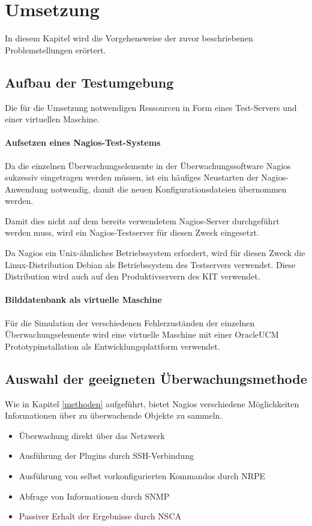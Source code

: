 \section{Umsetzung}
In diesem Kapitel wird die Vorgehensweise der zuvor beschriebenen Problemstellungen erörtert.

\subsection{Aufbau der Testumgebung}

Die für die Umsetzung notwendigen Ressourcen in Form eines Test-Servers und einer virtuellen Maschine.
\paragraph{Aufsetzen eines Nagios-Test-Systems}
Da die einzelnen Überwachungselemente in der Überwachungssoftware Nagios sukzessiv eingetragen werden müssen, ist ein häufiges Neustarten der Nagios-Anwendung notwendig, damit die neuen Konfigurationsdateien übernommen werden.

Damit dies nicht auf dem bereits verwendetem Nagios-Server durchgeführt werden muss, wird ein Nagios-Testserver für diesen Zweck eingesetzt.

Da Nagios ein Unix-ähnliches Betriebssystem erfordert, wird für diesen Zweck die Linux-Distribution Debian als Betriebssystem des Testservers verwendet.
Diese Distribution wird auch auf den Produktivservern des KIT verwendet.

\paragraph{Bilddatenbank als virtuelle Maschine}
Für die Simulation der verschiedenen Fehlerzuständen der einzelnen Überwachungselemente wird eine virtuelle Maschine mit einer \gls{OracleUCM} Prototypinstallation  als Entwicklungsplattform verwendet.

\subsection{Auswahl der geeigneten Überwachungsmethode}
\label{sectunixagents}
Wie in Kapitel \ref{methoden} aufgeführt, bietet Nagios verschiedene Möglichkeiten Informationen über zu überwachende Objekte zu sammeln.

\begin{itemize}
\item Überwachung direkt über das Netzwerk
\item Ausführung der Plugins durch \gls{SSH}-Verbindung
\item Ausführung von selbst vorkonfigurierten Kommandos durch \gls{NRPE}
\item Abfrage von Informationen durch \gls{SNMP}
\item Passiver Erhalt der Ergebnisse durch \gls{NSCA}
\end{itemize}

